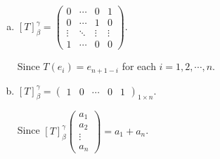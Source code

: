 \begin{Exercise}
\begin{enumerate}[(a)]
		\item
		\begin{answer}
			$[T]_{\beta}^{\gamma} = \begin{pmatrix}
			0 & \cdots & 0 & 1 \\
			0 & \cdots & 1 & 0 \\
			\vdots & \ddots & \vdots & \vdots \\
			1 & \cdots & 0 & 0
			\end{pmatrix}$.
		\end{answer}
		\begin{solution}
			Since $T(e_i) = e_{n+1-i}$ for each $i=1,2,\cdots,n$.
		\end{solution}
		
		\item
		\begin{answer}
			$[T]_{\beta}^{\gamma} = \begin{pmatrix}
			1 & 0 & \cdots & 0 & 1
			\end{pmatrix}_{1\times n}$.
		\end{answer}
		\begin{solution}
			Since
			$[T]_{\beta}^{\gamma}\begin{pmatrix}
			a_1 \\
			a_2 \\
			\vdots \\
			a_n
			\end{pmatrix}
			= a_1+a_n$.
		\end{solution}
	\end{enumerate}
\end{Exercise}